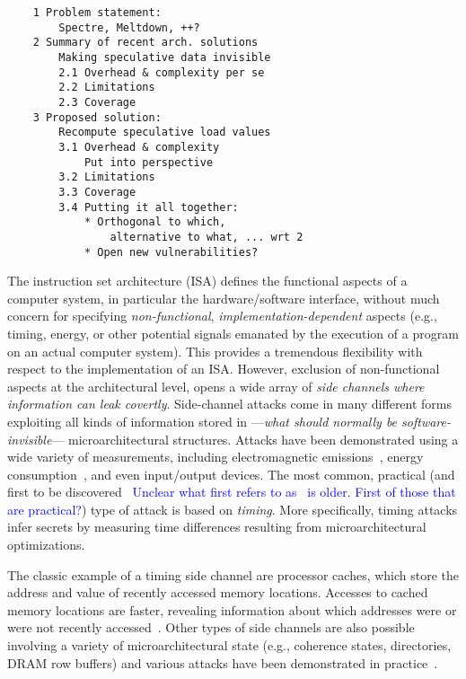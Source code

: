 \begin{verbatim}
    1 Problem statement: 
        Spectre, Meltdown, ++?
    2 Summary of recent arch. solutions
        Making speculative data invisible
        2.1 Overhead & complexity per se
        2.2 Limitations
        2.3 Coverage
    3 Proposed solution: 
        Recompute speculative load values
        3.1 Overhead & complexity 
            Put into perspective
        3.2 Limitations 
        3.3 Coverage
        3.4 Putting it all together:
            * Orthogonal to which, 
                alternative to what, ... wrt 2
            * Open new vulnerabilities?
\end{verbatim}


The instruction set architecture (ISA) defines the functional aspects of a computer system, in particular the hardware/software interface, without much concern for specifying \emph{non-functional}, \emph{implementation-dependent} aspects (e.g., timing, energy, or other potential signals emanated by the execution of a program on an actual computer system). This provides a tremendous flexibility with respect to the implementation of an ISA. However, exclusion of non-functional aspects at the architectural level, opens a wide array of \emph{side channels where information can leak covertly}. Side-channel attacks come in many different forms exploiting all kinds of information stored in ---\emph{what should normally be software-invisible}--- microarchitectural structures. Attacks have been demonstrated using a wide variety of measurements, including electromagnetic emissions~\cite{agrawal2002side}, energy consumption~\cite{kocher1999differential}, and even input/output devices\cite{genkin2014rsa,ferrigno2008aes,carmon2017photonic}. The most common, practical (and first to be discovered~\cite{bernstein2005cache} \textcolor{blue}{Unclear what first refers to as~\cite{agrawal2002side} is older. First of those that are practical?}) type of attack is based on \emph{timing}. More specifically, timing attacks infer secrets by measuring time differences resulting from microarchitectural optimizations.

The classic example of a timing side channel are processor caches, which store the address and value of recently accessed memory locations. Accesses to cached memory locations are faster, revealing information about which addresses were or were not recently accessed~\cite{yarom_flush+_2014,liu15llc,irazoqui_cross_2016}. Other types of side channels are also possible involving a variety of microarchitectural state (e.g., coherence states, directories, DRAM row buffers) 
and various attacks have been demonstrated in practice~\cite{}.

